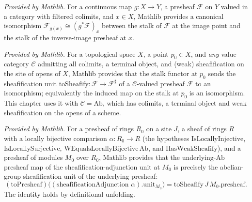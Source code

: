 \begin{lemma}
  \label{mathlib:stalkPullbackIso}
  \mathlibok
  \textit{Provided by Mathlib.}
  For a continuous map \(g:X\to Y\), a presheaf \(\mathcal F\) on \(Y\) valued in a
  category with filtered colimits, and \(x\in X\), Mathlib provides a canonical
  isomorphism \(\mathcal F_{g(x)}\cong(g^{*}\mathcal F)_{x}\) between the stalk of
  \(\mathcal F\) at the image point and the stalk of the inverse-image presheaf at
  \(x\).
\end{lemma}

\begin{lemma}
  \label{mathlib:stalkFunctor_unit_toSheafify_isIso}
  \mathlibok
  \textit{Provided by Mathlib.}
  For a topological space \(X\), a point \(p_0\in X\), and \emph{any} value category
  \(\mathcal C\) admitting all colimits, a terminal object, and (weak) sheafification
  on the site of opens of \(X\), Mathlib provides that the stalk functor at \(p_0\)
  sends the sheafification unit \(\mathrm{toSheafify}:\mathcal F\to\mathcal F^{\sharp}\)
  of a \(\mathcal C\)-valued presheaf \(\mathcal F\) to an isomorphism; equivalently the
  induced map on the stalk at \(p_0\) is an isomorphism.  This chapter uses it with
  \(\mathcal C=\mathrm{Ab}\), which has colimits, a terminal object and weak
  sheafification on the opens of a scheme.
\end{lemma}

\begin{lemma}
  \label{mathlib:toPresheaf_sheafification_unit}
  \mathlibok
  \textit{Provided by Mathlib.}
  For a presheaf of rings \(R_0\) on a site \(J\), a sheaf of rings \(R\) with a
  locally bijective comparison \(\alpha:R_0\to R\) (the hypotheses
  \(\mathrm{IsLocallyInjective}\), \(\mathrm{IsLocallySurjective}\),
  \(\mathrm{WEqualsLocallyBijective}\,\mathrm{Ab}\), and \(\mathrm{HasWeakSheafify}\)),
  and a presheaf of modules \(M_0\) over \(R_0\), Mathlib provides that the
  underlying-\(\mathrm{Ab}\) presheaf map of the sheafification-adjunction unit at
  \(M_0\) is precisely the abelian-group sheafification unit of the underlying presheaf:
  \[
    (\mathrm{toPresheaf})\bigl((\text{sheafificationAdjunction }\alpha).\mathrm{unit}_{M_0}\bigr)
    =\mathrm{toSheafify}\,J\,M_0.\mathrm{presheaf}.
  \]
  The identity holds by definitional unfolding.
\end{lemma}

